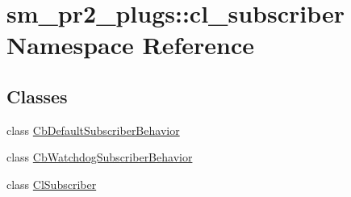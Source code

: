 \hypertarget{namespacesm__pr2__plugs_1_1cl__subscriber}{}\section{sm\+\_\+pr2\+\_\+plugs\+:\+:cl\+\_\+subscriber Namespace Reference}
\label{namespacesm__pr2__plugs_1_1cl__subscriber}
\subsection*{Classes}
\begin{DoxyCompactItemize}
\item 
class \hyperlink{classsm__pr2__plugs_1_1cl__subscriber_1_1CbDefaultSubscriberBehavior}{Cb\+Default\+Subscriber\+Behavior}
\item 
class \hyperlink{classsm__pr2__plugs_1_1cl__subscriber_1_1CbWatchdogSubscriberBehavior}{Cb\+Watchdog\+Subscriber\+Behavior}
\item 
class \hyperlink{classsm__pr2__plugs_1_1cl__subscriber_1_1ClSubscriber}{Cl\+Subscriber}
\end{DoxyCompactItemize}
